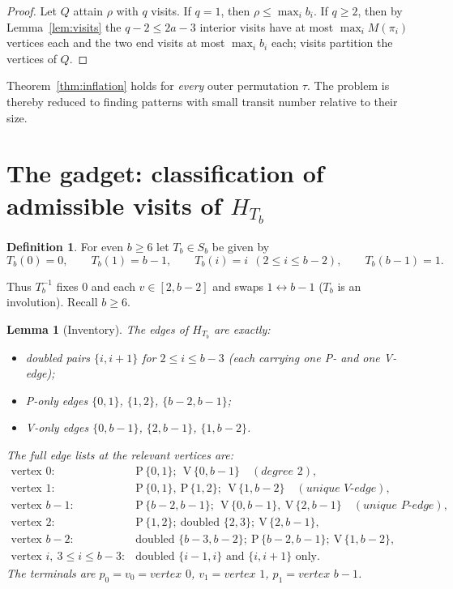 \documentclass[11pt]{article}
\newtheorem{lemma}[theorem]{Lemma}
\theoremstyle{definition}
\newtheorem{definition}[theorem]{Definition}
\newcommand{\inv}[1]{#1^{-1}}
\begin{document}
\begin{proof}
Let $Q$ attain $\rho$ with $q$ visits. If $q = 1$, then $\rho \le \max_i b_i$. If
$q \ge 2$, then by Lemma~\ref{lem:visits} the $q - 2 \le 2a - 3$ interior visits have
at most $\max_i M(\pi_i)$ vertices each and the two end visits at most $\max_i b_i$
each; visits partition the vertices of $Q$.
\end{proof}

Theorem~\ref{thm:inflation} holds for \emph{every} outer permutation $\tau$. The
problem is thereby reduced to finding patterns with small transit number relative to
their size.

\section{The gadget: classification of admissible visits of
\texorpdfstring{$H_{T_b}$}{H\_\{T\_b\}}}\label{sec:gadget}

\begin{definition}\label{def:Tb}
For even $b \ge 6$ let $T_b \in S_b$ be given by
\[
T_b(0) = 0, \qquad T_b(1) = b-1, \qquad T_b(i) = i \ \ (2 \le i \le b-2), \qquad
T_b(b-1) = 1 .
\]
\end{definition}

Thus $\inv{T_b}$ fixes $0$ and each $v \in [2, b-2]$ and swaps $1 \leftrightarrow b-1$
($T_b$ is an involution). Recall $b \ge 6$.

\begin{lemma}[Inventory]\label{lem:inventory}
The edges of $H_{T_b}$ are exactly:
\begin{itemize}
\item \emph{doubled pairs} $\{i, i+1\}$ for $2 \le i \le b-3$ (each carrying one P- and
one V-edge);
\item \emph{P-only edges} $\{0,1\}$, $\{1,2\}$, $\{b-2, b-1\}$;
\item \emph{V-only edges} $\{0, b-1\}$, $\{2, b-1\}$, $\{1, b-2\}$.
\end{itemize}
The full edge lists at the relevant vertices are:
\[
\begin{array}{ll}
\text{vertex } 0: & \mathrm P\,\{0,1\};\ \ \mathrm V\,\{0,b{-}1\} \quad
(\textit{degree } 2),\\[2pt]
\text{vertex } 1: & \mathrm P\,\{0,1\},\ \mathrm P\,\{1,2\};\ \ \mathrm V\,\{1,b{-}2\}
\quad (\textit{unique V-edge}),\\[2pt]
\text{vertex } b{-}1: & \mathrm P\,\{b{-}2,b{-}1\};\ \ \mathrm V\,\{0,b{-}1\},\
\mathrm V\,\{2,b{-}1\} \quad (\textit{unique P-edge}),\\[2pt]
\text{vertex } 2: & \mathrm P\,\{1,2\};\ \text{doubled } \{2,3\};\
\mathrm V\,\{2,b{-}1\},\\[2pt]
\text{vertex } b{-}2: & \text{doubled } \{b{-}3,b{-}2\};\ \mathrm P\,\{b{-}2,b{-}1\};\
\mathrm V\,\{1,b{-}2\},\\[2pt]
\text{vertex } i,\ 3 \le i \le b-3: & \text{doubled } \{i{-}1,i\} \text{ and }
\{i,i{+}1\} \text{ only}.
\end{array}
\]
The terminals are $p_0 = v_0 = \textit{vertex } 0$, $v_1 = \textit{vertex } 1$,
$p_1 = \textit{vertex } b-1$.
\end{lemma}
\end{document}
